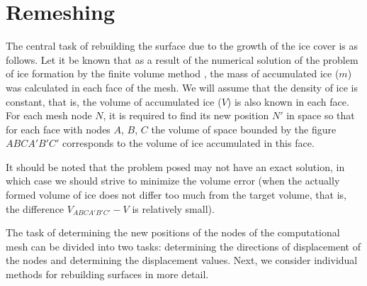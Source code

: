 \documentclass[
11pt,%
tightenlines,%
twoside,%
onecolumn,%
nofloats,%
nobibnotes,%
nofootinbib,%
superscriptaddress,%
noshowpacs,%
centertags]%
{revtex4-2}
\begin{document}

\section{Remeshing}

The central task of rebuilding the surface due to the growth of the ice cover is as follows.
Let it be known that as a result of the numerical solution of the problem of ice formation by the finite volume method \cite{Beaugendre}, the mass of accumulated ice ($m$) was calculated in each face of the mesh.
We will assume that the density of ice is constant, that is, the volume of accumulated ice ($V$) is also known in each face.
For each mesh node $N$, it is required to find its new position $N'$ in space so that for each face with nodes $A$, $B$, $C$ the volume of space bounded by the figure $ABCA'B'C'$ corresponds to the volume of ice accumulated in this face.

It should be noted that the problem posed may not have an exact solution, in which case we should strive to minimize the volume error (when the actually formed volume of ice does not differ too much from the target volume, that is, the difference $V_{ABCA'B'C'} - V$ is relatively small).

The task of determining the new positions of the nodes of the computational mesh can be divided into two tasks: determining the directions of displacement of the nodes and determining the displacement values.
Next, we consider individual methods for rebuilding surfaces in more detail.
\end{document}
